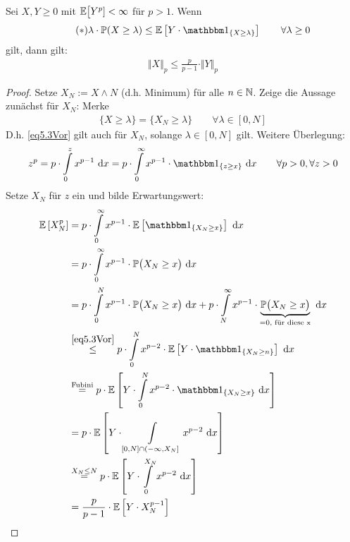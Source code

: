\begin{lemma}\label{lemma5.3}
Sei $X,Y\geq0$ mit $\mathbb{E}\big[Y^p]<\infty$ für $p>1$. Wenn
\begin{align}\label{eq5.3Vor}\tag{$\ast$}
\lambda\cdot\P(X\geq\lambda)\leq\E\left[Y\cdot\indi_{\lbrace X\geq\lambda\rbrace}\right]\qquad\forall\lambda\geq0
\end{align}
gilt, dann gilt:
\begin{align*}
\Vert X\Vert_p\leq\frac{p}{p-1}\cdot\Vert Y\Vert_p
\end{align*}
\end{lemma}
\begin{proof}
Setze $X_N:=X\wedge N$ (d.h. Minimum) für alle $n\in\mathbb{N}$. Zeige die Aussage zunächst für $X_N$: Merke
\begin{align*}
\lbrace X\geq\lambda\rbrace=\lbrace X_N\geq\lambda\rbrace\qquad\forall\lambda\in[0,N]
\end{align*}
D.h. \eqref{eq5.3Vor} gilt auch für $X_N$, solange $\lambda\in[0,N]$ gilt. Weitere Überlegung:
\begin{align*} %
z^p
= p\cdot\int\limits_0^z x^{p-1}\d x
=p\cdot\int\limits_0^\infty x^{p-1}\cdot\indi_{\lbrace z\geq x\rbrace}\d x\qquad\forall p>0,\forall z>0
\end{align*}
Setze $X_N$ für $z$ ein und bilde Erwartungswert:
\begin{align*}
\E\left[X_N^p\right]
&=p\cdot\int\limits_0^\infty x^{p-1}\cdot\E\left[\indi_{\lbrace X_N \geq x\rbrace}\right]\d x \\
&=p\cdot\int\limits_0^\infty x^{p-1}\cdot\P\big(X_N\geq x\big)\d x\\
&=p\cdot\int\limits_0^N x^{p-1}\cdot\P\big(X_N\geq x\big)\d x + p\cdot\int\limits_N^\infty x^{p-1}\cdot\underbrace{\P\big(X_N\geq x\big)}_{=0,\text{ für diese x}}\d x\\
&\stackrel{\eqref{eq5.3Vor}}{\leq}
p\cdot\int\limits_0^N x^{p-2}\cdot\E\left[Y\cdot\indi_{\lbrace X_N\geq n\rbrace}\right]\d x\\
&\stackeq{\text{Fubini}}
p\cdot\E\left[Y\cdot\int\limits_0^N x^{p-2}\cdot\indi_{\lbrace X_N\geq x\rbrace}\d x\right]\\
&=p\cdot\E\left[Y\cdot\int\limits_{[0,N]\cap(-\infty,X_N]} x^{p-2}\d x\right]\\
&\stackeq{X_N\leq N}p\cdot\E\left[Y\cdot\int\limits_0^{X_N} x^{p-2}\d x\right]\\
&=\frac{p}{p-1}\cdot\E\left[Y\cdot X_N^{p-1}\right]\\
\end{align*}

\end{proof}
